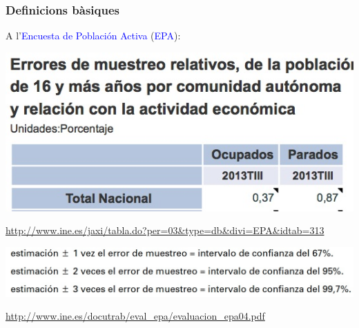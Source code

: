 \documentclass[12pt,t]{beamer}
\newcommand{\blue}[1]{\textcolor{blue}{#1}}
\theoremstyle{plain}
\theoremstyle{definition}
\begin{document}
\begin{frame}
\frametitle{Definicions bàsiques}

A l'\blue{Encuesta de Población Activa} (\blue{EPA}):

\begin{center}
\includegraphics[width=0.6\linewidth]{EPA1}

{\scriptsize \url{http://www.ine.es/jaxi/tabla.do?per=03&type=db&divi=EPA&idtab=313}}
\medskip

\includegraphics[width=\linewidth]{EPA2}


{\scriptsize \url{http://www.ine.es/docutrab/eval_epa/evaluacion_epa04.pdf}}
\end{center}
\end{frame}
\end{document}
